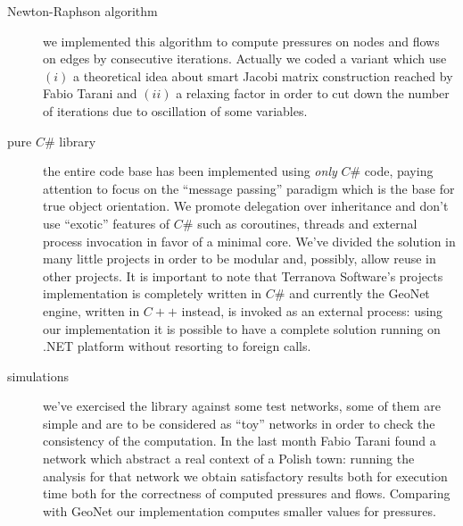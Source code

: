 \documentclass[twoside,openright,titlepage,fleqn,
headinclude,11pt,a4paper,BCOR5mm,footinclude ]{scrbook}
\begin{document}
\begin{description}
\item[Newton-Raphson algorithm] we implemented this algorithm to compute
pressures on nodes and flows on edges by consecutive iterations. 
Actually we coded a variant which use
$(i)$ a theoretical idea about smart Jacobi matrix construction reached by Fabio
Tarani and $(ii)$ a relaxing factor in order to cut down the number of
iterations due to oscillation of some variables.

\item[pure $C\#$ library] the entire code base has been implemented using
\emph{only} $C\#$ code, paying attention to focus on the ``message passing''
paradigm which is the base for true object orientation. We promote delegation
over inheritance and don't use ``exotic'' features of $C\#$
such as coroutines, threads and external process invocation in favor of a 
minimal core. We've divided the solution in many little projects in order to be 
modular and, possibly, allow reuse in other projects. It is important to note that
Terranova Software's projects implementation is completely written in $C\#$ and
currently the GeoNet engine, written in $C++$ instead, is invoked as an external
process: using our implementation it is possible to have a complete solution running 
on .NET platform without resorting to foreign calls.

\item[simulations] we've exercised the library against some test networks, some
of them are simple and are to be considered as ``toy'' networks in order to
check the consistency of the computation. In the last month Fabio Tarani found a
network which abstract a real context of a Polish town: running the analysis for
that network we obtain satisfactory results both for execution time both for the
correctness of computed pressures and flows. Comparing with GeoNet our
implementation computes smaller values for pressures.
\end{description}
\end{document}
